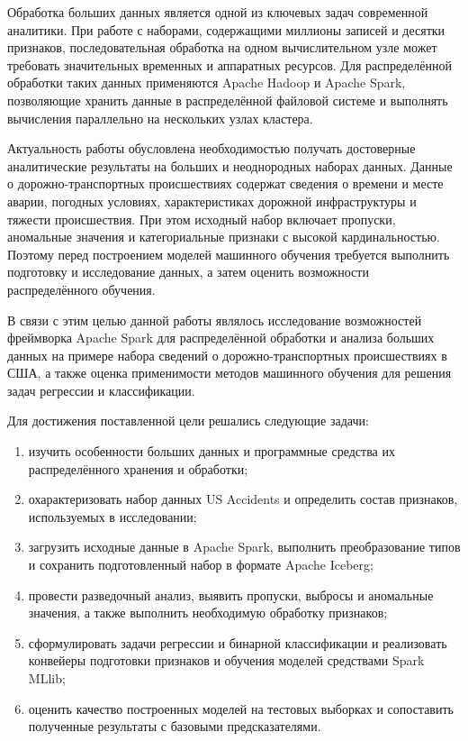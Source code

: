 Обработка больших данных является одной из ключевых задач современной аналитики. При работе с наборами, содержащими миллионы записей и десятки признаков, последовательная обработка на одном вычислительном узле может требовать значительных временных и аппаратных ресурсов. Для распределённой обработки таких данных применяются Apache Hadoop и Apache Spark, позволяющие хранить данные в распределённой файловой системе и выполнять вычисления параллельно на нескольких узлах кластера.

Актуальность работы обусловлена необходимостью получать достоверные аналитические результаты на больших и неоднородных наборах данных. Данные о дорожно-транспортных происшествиях содержат сведения о времени и месте аварии, погодных условиях, характеристиках дорожной инфраструктуры и тяжести происшествия. При этом исходный набор включает пропуски, аномальные значения и категориальные признаки с высокой кардинальностью. Поэтому перед построением моделей машинного обучения требуется выполнить подготовку и исследование данных, а затем оценить возможности распределённого обучения.

В связи с этим целью данной работы являлось исследование возможностей фреймворка Apache Spark для распределённой обработки и анализа больших данных на примере набора сведений о дорожно-транспортных происшествиях в США, а также оценка применимости методов машинного обучения для решения задач регрессии и классификации.

Для достижения поставленной цели решались следующие задачи:
\begin{enumerate}
    \item изучить особенности больших данных и программные средства их распределённого хранения и обработки;
    \item охарактеризовать набор данных US Accidents и определить состав признаков, используемых в исследовании;
    \item загрузить исходные данные в Apache Spark, выполнить преобразование типов и сохранить подготовленный набор в формате Apache Iceberg;
    \item провести разведочный анализ, выявить пропуски, выбросы и аномальные значения, а также выполнить необходимую обработку признаков;
    \item сформулировать задачи регрессии и бинарной классификации и реализовать конвейеры подготовки признаков и обучения моделей средствами Spark MLlib;
    \item оценить качество построенных моделей на тестовых выборках и сопоставить полученные результаты с базовыми предсказателями.
\end{enumerate}

